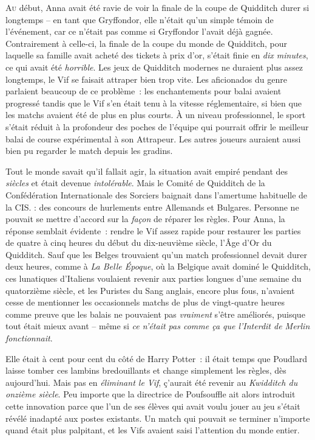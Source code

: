
\lettrine{A}{u} début, Anna avait été ravie de voir la finale de la coupe de Quidditch durer si longtemps -- en tant que Gryffondor, elle n'était qu'un simple témoin de l'événement, car ce n'était pas comme si Gryffondor l'avait déjà gagnée.
Contrairement à celle-ci, la finale de la coupe du monde de Quidditch, pour laquelle sa famille avait acheté des tickets à prix d'or, s'était finie en \emph{dix minutes}, ce qui avait été \emph{horrible}.
Les jeux de Quidditch modernes ne duraient plus assez longtemps, le Vif se faisait attraper bien trop vite.
Les aficionados du genre parlaient beaucoup de ce problème~: les enchantements pour balai avaient progressé tandis que le Vif s'en était tenu à la vitesse réglementaire, si bien que les matchs avaient été de plus en plus courts.
À un niveau professionnel, le sport s'était réduit à la profondeur des poches de l'équipe qui pourrait offrir le meilleur balai de course expérimental à son Attrapeur.
Les autres joueurs auraient aussi bien pu regarder le match depuis les gradins.

Tout le monde savait qu'il fallait agir, la situation avait empiré pendant des \emph{siècles} et était devenue \emph{intolérable}.
Mais le Comité de Quidditch de la Confédération Internationale des Sorciers baignait dans l'amertume habituelle de la CIS.
: des concours de hurlements entre Allemands et Bulgares.
Personne ne pouvait se mettre d'accord sur la \emph{façon} de réparer les règles.
Pour Anna, la réponse semblait évidente~: rendre le Vif assez rapide pour restaurer les parties de quatre à cinq heures du début du dix-neuvième siècle, l'Âge d'Or du Quidditch.
Sauf que les Belges trouvaient qu'un match professionnel devait durer deux heures, comme à \emph{La Belle Époque}, où la Belgique avait dominé le Quidditch, ces lunatiques d'Italiens voulaient revenir aux parties longues d'une semaine du quatorzième siècle, et les Puristes du Sang anglais, encore plus fous, n'avaient cesse de mentionner les occasionnels matchs de plus de vingt-quatre heures comme preuve que les balais ne pouvaient pas \emph{vraiment} s'être améliorés, puisque tout était mieux avant -- même si \emph{ce n'était pas comme ça que l'Interdit de Merlin fonctionnait}.

Elle était à cent pour cent du côté de Harry Potter~: il était temps que Poudlard laisse tomber ces lambins bredouillants et change simplement les règles, dès aujourd'hui.
Mais pas en \emph{éliminant le Vif}, ç'aurait été revenir au \emph{Kwidditch du onzième siècle}.
Peu importe que la directrice de Poufsouffle ait alors introduit cette innovation parce que l'un de ses élèves qui avait voulu jouer au jeu s'était révélé inadapté aux postes existants.
Un match qui pouvait se terminer n'importe quand était plus palpitant, et les Vifs avaient saisi l'attention du monde entier.

